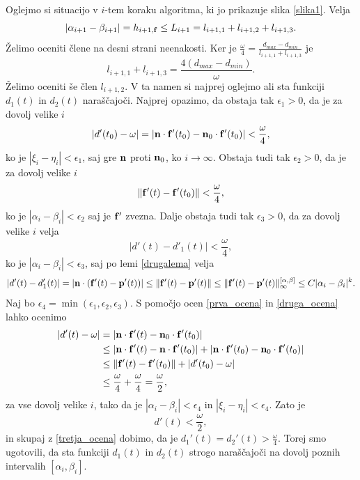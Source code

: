Oglejmo si situacijo v $i$-tem koraku algoritma, ki jo prikazuje slika \ref{slika1}. Velja 
$$
|\alpha _{i+1}-\beta _{i+1}| = h_{i+1,{\bf f}} \leq L_{i+1} = l_{i+1,1} + l_{i+1,2} + l_{i+1,3}.
$$
Želimo oceniti člene na desni strani neenakosti. Ker je $\frac{\omega}{4} = \frac{d_{max}-d_{min}}{l_{i+1,1}  + l_{i+1,3}}$ je
\begin{equation}
l_{i+1,1}  + l_{i+1,3} = \frac{4(d_{max} - d_{min})}{\omega}.
\end{equation}
Želimo oceniti še člen $l_{i+1,2}$. V ta namen si najprej oglejmo ali sta funkciji $d_1(t)$ in $d_2(t)$ naraščajoči. Najprej opazimo, da obstaja tak $\epsilon _1>0$, da je za dovolj velike $i$  
\begin{equation}\label{prva_ocena}
|d'(t_0) - \omega| = |{\bf n}\cdot {\bf f}'(t_0) - {\bf n}_0 \cdot {\bf f}'(t_0)| < \frac{\omega}{4},
\end{equation}
ko je $|\xi _i - \eta _i| < \epsilon _1$, saj gre ${\bf n}$ proti ${\bf n}_0$, ko $i\rightarrow\infty$. Obstaja tudi tak $\epsilon _2 > 0$, da je za dovolj velike $i$
\begin{equation}\label{druga_ocena}
\lVert {\bf f}'(t) - {\bf f}'(t_0)\rVert < \frac{\omega}{4},
\end{equation}
ko je $|\alpha _i - \beta _i| < \epsilon _2$ saj je ${\bf f}'$ zvezna. Dalje obstaja tudi tak $\epsilon _3 > 0$, da za dovolj velike $i$ velja
\begin{equation}\label{tretja_ocena}
|d'(t)-d'_1(t)| < \frac{\omega}{4},
\end{equation}
ko je $|\alpha _i - \beta _i| < \epsilon _3$, saj po lemi \ref{drugalema} velja
$$
|d'(t)-d'_1(t)| = |{\bf n}\cdot ({\bf f}'(t) - {\bf p}'(t))| \leq \lVert {\bf f}'(t) - {\bf p}'(t) \rVert \leq \lVert {\bf f}'(t) - {\bf p}'(t) \rVert _{\infty}^{[\alpha,\beta]} \leq C|\alpha _i- \beta_i|^k.
$$
Naj bo $\epsilon _4 = \min (\epsilon _1, \epsilon _2, \epsilon _3)$. S pomočjo ocen \ref{prva_ocena} in \ref{druga_ocena} lahko ocenimo
\begin{equation*}
\begin{split}
|d'(t)-\omega| & = |{\bf n}\cdot {\bf f}'(t) - {\bf n}_0\cdot{\bf f}'(t_0)| \\
& \leq |{\bf n}\cdot {\bf f}'(t) - {\bf n}\cdot{\bf f}'(t_0)| + 
|{\bf n}\cdot {\bf f}'(t_0) - {\bf n}_0\cdot{\bf f}'(t_0)|\\
&\leq \lVert {\bf f}'(t) - {\bf f}'(t_0)\rVert + |d'(t_0)-\omega|\\
&\leq \frac{\omega}{4} + \frac{\omega}{4} = \frac{\omega}{2},
\end{split}
\end{equation*}
za vse dovolj velike $i$, tako da je $|\alpha _i-\beta _i| < \epsilon _4$ in $|\xi _i - \eta _i| < \epsilon _4$. Zato je 
\begin{equation}\label{ocena_omega}
d'(t)<\frac{\omega}{2},
\end{equation}
 in skupaj z \ref{tretja_ocena} dobimo, da je $d_1'(t) = d_2'(t) > \frac{\omega}{4}$. Torej smo ugotovili, da sta funkciji $d_1(t)$ in $d_2(t)$ strogo naraščajoči na dovolj poznih intervalih $[\alpha _i, \beta _i]$.

